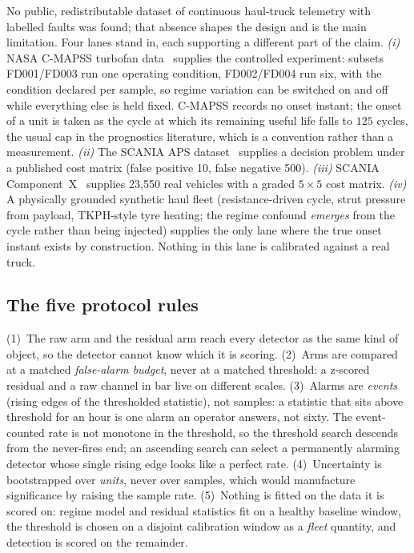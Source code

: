 \documentclass[journal]{IEEEtran}
\begin{document}
No public, redistributable dataset of continuous haul-truck telemetry with labelled faults was found; that
absence shapes the design and is the main limitation. Four lanes stand in, each supporting a different
part of the claim. \emph{(i)} NASA C-MAPSS turbofan data~\cite{saxena2008} supplies the controlled
experiment: subsets FD001/FD003 run one operating condition, FD002/FD004 run six, with the condition
declared per sample, so regime variation can be switched on and off while everything else is held fixed.
C-MAPSS records no onset instant; the onset of a unit is taken as the cycle at which its remaining useful
life falls to $125$ cycles, the usual cap in the prognostics literature, which is a convention rather than a
measurement. \emph{(ii)} The SCANIA APS dataset~\cite{aps2016} supplies a decision problem under a published
cost matrix (false positive 10, false negative 500). \emph{(iii)} SCANIA Component~X~\cite{componentx2024}
supplies 23{,}550 real vehicles with a graded $5\times5$ cost matrix. \emph{(iv)} A physically grounded
synthetic haul fleet (resistance-driven cycle, strut pressure from payload, TKPH-style tyre heating; the
regime confound \emph{emerges} from the cycle rather than being injected) supplies the only lane where the
true onset instant exists by construction. Nothing in this lane is calibrated against a real truck.

\subsection{The five protocol rules}

(1)~The raw arm and the residual arm reach every detector as the same kind of object, so the detector
cannot know which it is scoring. (2)~Arms are compared at a matched \emph{false-alarm budget}, never at a
matched threshold: a z-scored residual and a raw channel in bar live on different scales.
(3)~Alarms are \emph{events} (rising edges of the thresholded statistic), not samples: a statistic that
sits above threshold for an hour is one alarm an operator answers, not sixty. The event-counted rate is
not monotone in the threshold, so the threshold search descends from the never-fires end; an ascending
search can select a permanently alarming detector whose single rising edge looks like a perfect rate.
(4)~Uncertainty is bootstrapped over \emph{units}, never over samples, which would manufacture
significance by raising the sample rate. (5)~Nothing is fitted on the data it is scored on: regime model
and residual statistics fit on a healthy baseline window, the threshold is chosen on a disjoint calibration
window as a \emph{fleet} quantity, and detection is scored on the remainder.
\end{document}
